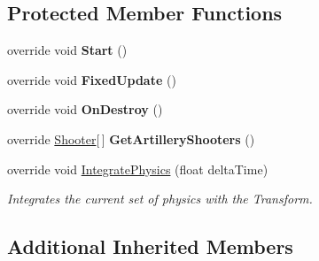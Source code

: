 \subsection*{Protected Member Functions}
\begin{DoxyCompactItemize}
\item 
\hypertarget{class_skyrates_1_1_client_1_1_entity_1_1_entity_ship_navy_ae26515dbbab5e7ccd94bc182077a3703}{override void {\bfseries Start} ()}\label{class_skyrates_1_1_client_1_1_entity_1_1_entity_ship_navy_ae26515dbbab5e7ccd94bc182077a3703}

\item 
\hypertarget{class_skyrates_1_1_client_1_1_entity_1_1_entity_ship_navy_aa550d27c1aaf35d1cf2d3c9ab6072d19}{override void {\bfseries Fixed\-Update} ()}\label{class_skyrates_1_1_client_1_1_entity_1_1_entity_ship_navy_aa550d27c1aaf35d1cf2d3c9ab6072d19}

\item 
\hypertarget{class_skyrates_1_1_client_1_1_entity_1_1_entity_ship_navy_af524017b295a99be4257b6cbd3ded232}{override void {\bfseries On\-Destroy} ()}\label{class_skyrates_1_1_client_1_1_entity_1_1_entity_ship_navy_af524017b295a99be4257b6cbd3ded232}

\item 
\hypertarget{class_skyrates_1_1_client_1_1_entity_1_1_entity_ship_navy_a17878da64a10dc79fb3dfd48f496f7c7}{override \hyperlink{class_shooter}{Shooter}\mbox{[}$\,$\mbox{]} {\bfseries Get\-Artillery\-Shooters} ()}\label{class_skyrates_1_1_client_1_1_entity_1_1_entity_ship_navy_a17878da64a10dc79fb3dfd48f496f7c7}

\item 
override void \hyperlink{class_skyrates_1_1_client_1_1_entity_1_1_entity_ship_navy_a689b368554044f48d19b20aed42fe104}{Integrate\-Physics} (float delta\-Time)
\begin{DoxyCompactList}\small\item\em Integrates the current set of physics with the Transform. \end{DoxyCompactList}\end{DoxyCompactItemize}
\subsection*{Additional Inherited Members}



